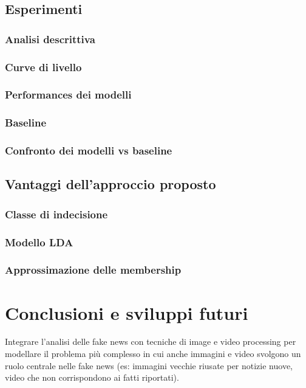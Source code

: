 \documentclass[12pt]{report}
\theoremstyle{definition}
\begin{document}
\section{Esperimenti}
\subsection{Analisi descrittiva}
\subsection{Curve di livello}
\subsection{Performances dei modelli}
\subsection{Baseline}
\subsection{Confronto dei modelli vs baseline}
\section{Vantaggi dell'approccio proposto}
\subsection{Classe di indecisione}
\subsection{Modello LDA}
\subsection{Approssimazione delle membership}

\chapter*{Conclusioni e sviluppi futuri}
\onehalfspacing

Integrare l'analisi delle fake news con tecniche di image e video processing per modellare il problema più complesso in cui anche immagini e video svolgono un ruolo centrale nelle fake news (es: immagini vecchie riusate per notizie nuove, video che non corrispondono ai fatti riportati).

\printbibliography

%
\end{document}
